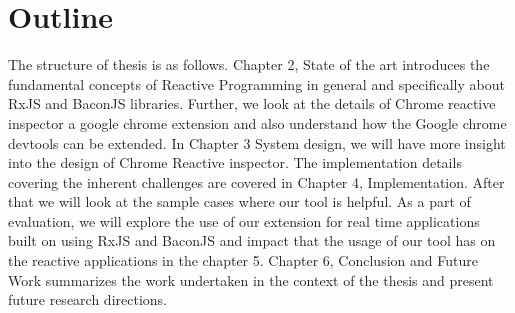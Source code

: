 \section{Outline}

The structure of thesis is as follows. Chapter 2, State of the art introduces the fundamental concepts of Reactive Programming in general and specifically about RxJS and BaconJS libraries. 
Further, we look at the details of Chrome reactive inspector a google chrome extension and also understand how the Google chrome devtools can be extended. In Chapter 3 System design, we will have more insight into the design of Chrome Reactive inspector. 
The implementation details covering the inherent challenges are covered in Chapter 4, Implementation. 
After that we will look at the sample cases where our tool is helpful. 
As a part of evaluation, we will explore the use of our  extension for real time applications built on using RxJS and BaconJS and impact that the usage of our tool has on the reactive applications in the chapter 5. 
Chapter 6, Conclusion and Future Work summarizes the work undertaken in the context of the thesis and present future research directions.



